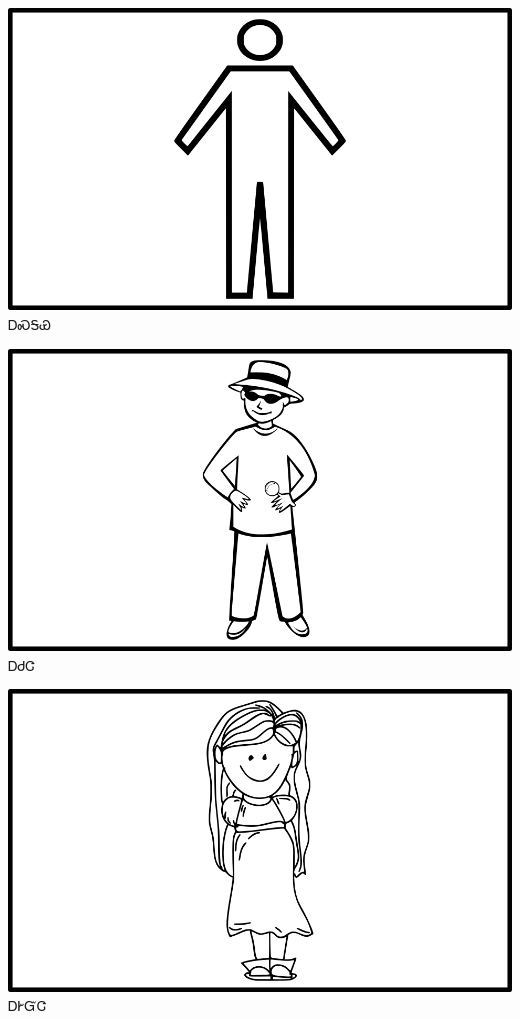 \documentclass[avery5371]{flashcards}%
\begin{document}
\begin{flashcard}{
\includegraphics[width=0.95\columnwidth,height=.51\columnwidth,keepaspectratio]{../artwork/objects-animate/asgaya}
}
\Huge ᎠᏍᎦᏯ
\end{flashcard}

\begin{flashcard}{
\includegraphics[width=0.95\columnwidth,height=.51\columnwidth,keepaspectratio]{../artwork/objects-animate/achuja}
}
\Huge ᎠᏧᏣ
\end{flashcard}

\begin{flashcard}{
\includegraphics[width=0.95\columnwidth,height=.51\columnwidth,keepaspectratio]{../artwork/objects-animate/agehyuja}
}
\Huge ᎠᎨᏳᏣ
\end{flashcard}
\end{document}
